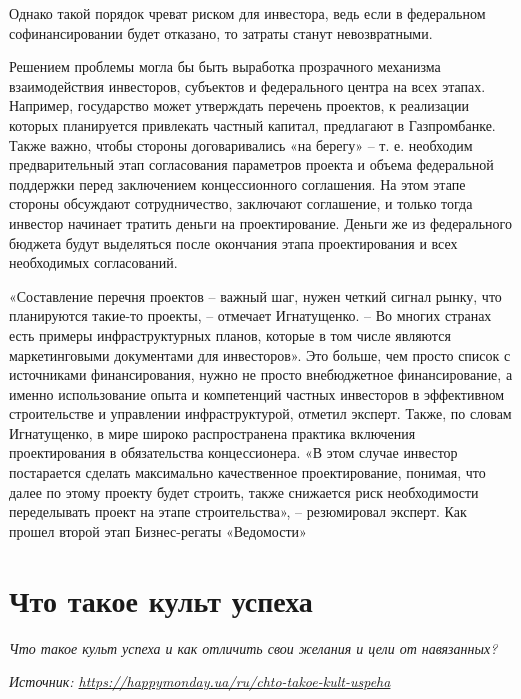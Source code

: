 Однако такой порядок чреват риском для инвестора, ведь если в федеральном софинансировании будет отказано, то затраты станут невозвратными.



Решением проблемы могла бы быть выработка прозрачного механизма взаимодействия инвесторов, субъектов и федерального центра на всех этапах. Например, государство может утверждать перечень проектов, к реализации которых планируется привлекать частный капитал, предлагают в Газпромбанке. Также важно, чтобы стороны договаривались «на берегу» – т. е. необходим предварительный этап согласования параметров проекта и объема федеральной поддержки перед заключением концессионного соглашения. На этом этапе стороны обсуждают сотрудничество, заключают соглашение, и только тогда инвестор начинает тратить деньги на проектирование. Деньги же из федерального бюджета будут выделяться после окончания этапа проектирования и всех необходимых согласований.

«Составление перечня проектов – важный шаг, нужен четкий сигнал рынку, что планируются такие-то проекты, – отмечает Игнатущенко. – Во многих странах есть примеры инфраструктурных планов, которые в том числе являются маркетинговыми документами для инвесторов». Это больше, чем просто список с источниками финансирования, нужно не просто внебюджетное финансирование, а именно использование опыта и компетенций частных инвесторов в эффективном строительстве и управлении инфраструктурой, отметил эксперт. Также, по словам Игнатущенко, в мире широко распространена практика включения проектирования в обязательства концессионера. «В этом случае инвестор постарается сделать максимально качественное проектирование, понимая, что далее по этому проекту будет строить, также снижается риск необходимости переделывать проект на этапе строительства», – резюмировал эксперт.
Как прошел второй этап Бизнес-регаты «Ведомости»

\clearpage


\section{Что такое культ успеха}

\textit{Что такое культ успеха и как отличить свои желания и цели от навязанных?}

\textit{Источник: \url{https://happymonday.ua/ru/chto-takoe-kult-uspeha}}

